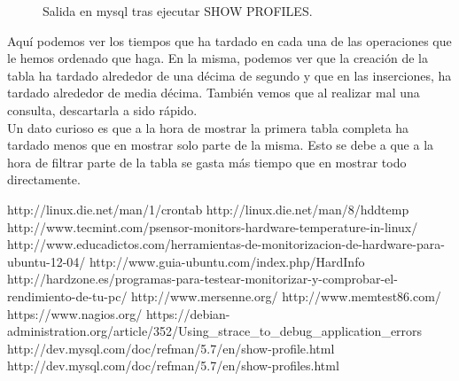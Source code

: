 \begin{itemize}
\begin{figure}[H]
	\caption[mysqlProfiles]{Salida en mysql tras ejecutar SHOW PROFILES.}
	\label{fig:mysqlProfiles}
	\end{figure}
	Aquí podemos ver los tiempos que ha tardado en cada una de las operaciones que le hemos ordenado que haga. En la misma, podemos ver que la creación de la tabla ha tardado alrededor de una décima de segundo y que en las inserciones, ha tardado alrededor de media décima. También vemos que al realizar mal una consulta, descartarla a sido rápido. \\
	Un dato curioso es que a la hora de mostrar la primera tabla completa  ha tardado menos que en mostrar solo parte de la misma. Esto se debe a que a la hora de filtrar parte de la tabla se gasta más tiempo que en mostrar todo directamente.

\end{itemize}
\newpage
\begin{thebibliography}{xx}
	 http://linux.die.net/man/1/crontab
	 http://linux.die.net/man/8/hddtemp
	 http://www.tecmint.com/psensor-monitors-hardware-temperature-in-linux/
	 http://www.educadictos.com/herramientas-de-monitorizacion-de-hardware-para-ubuntu-12-04/
	 http://www.guia-ubuntu.com/index.php/HardInfo
	 http://hardzone.es/programas-para-testear-monitorizar-y-comprobar-el-rendimiento-de-tu-pc/
	 http://www.mersenne.org/
	 http://www.memtest86.com/
	 https://www.nagios.org/
	 https://debian-administration.org/article/352/Using\_strace\_to\_debug\_application\_errors
	 http://dev.mysql.com/doc/refman/5.7/en/show-profile.html
	 http://dev.mysql.com/doc/refman/5.7/en/show-profiles.html
	
\end{thebibliography}
